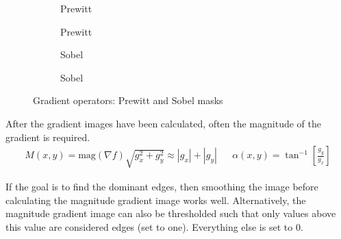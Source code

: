 \begin{figure}[!h]
	\centering
	\begin{subfigure}[b]{0.2\textwidth}
		\centering
		\caption{Prewitt}
	\end{subfigure}
	\begin{subfigure}[b]{0.2\textwidth}
		\centering
		\caption{Prewitt}
	\end{subfigure}
	\begin{subfigure}[b]{0.2\textwidth}
		\centering
		\caption{Sobel}
	\end{subfigure}
	\begin{subfigure}[b]{0.2\textwidth}
		\centering
		\caption{Sobel}
	\end{subfigure}
	\caption{Gradient operators: Prewitt and Sobel masks}
\end{figure}

After the gradient images have been calculated, often the magnitude of the gradient is required.
\begin{align*}
	M(x,y) = \text{mag}(\nabla f) \sqrt{g_x^2 + g_y^2} \approx |g_x|+|g_y| && \alpha(x,y) = \tan^{-1} \left[ \frac{g_y}{g_x} \right]
\end{align*}

If the goal is to find the dominant edges, then smoothing the image before calculating the magnitude gradient image works well. Alternatively, the magnitude gradient image can also be thresholded such that only values above this value are considered edges (set to one). Everything else is set to 0.
